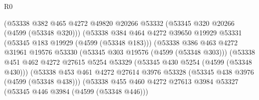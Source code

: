 \begin{lexlean}{R0}
\begin{coremodule}
                                      (@53338
                                        @382
                                        @465
                                        @4272
                                        @49820
                                        @20266
                                        @53332
                                        (@53345 @320 @20266 (@4599 (@53348 @320)))
                                        (@53338
                                          @384
                                          @464
                                          @4272
                                          @39650
                                          @19929
                                          @53331
                                          (@53345 @183 @19929 (@4599 (@53348 @183)))
                                          (@53338
                                            @386
                                            @463
                                            @4272
                                            @31961
                                            @19576
                                            @53330
                                            (@53345 @303 @19576 (@4599 (@53348 @303)))
                                            (@53338
                                              @451
                                              @462
                                              @4272
                                              @27615
                                              @5254
                                              @53329
                                              (@53345 @430 @5254 (@4599 (@53348 @430)))
                                              (@53338
                                                @453
                                                @461
                                                @4272
                                                @27614
                                                @3976
                                                @53328
                                                (@53345 @438 @3976 (@4599 (@53348 @438)))
                                                (@53338
                                                  @455
                                                  @460
                                                  @4272
                                                  @27613
                                                  @3984
                                                  @53327
                                                  (@53345 @446 @3984 (@4599 (@53348 @446)))

\end{coremodule}
\end{lexlean}

